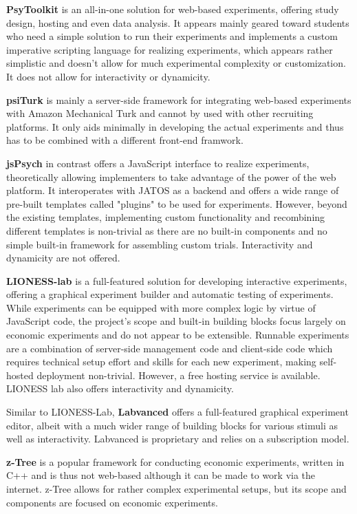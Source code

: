 \documentclass[a4paper,10pt]{paper}
\begin{document}
\textbf{PsyToolkit} \citep{Stoet2012} is an all-in-one solution for web-based experiments, offering study design, hosting and even data analysis. It appears mainly geared toward students who need a simple solution to run their experiments and implements a custom imperative scripting language for realizing experiments, which appears rather simplistic and doesn't allow for much experimental complexity or customization. It does not allow for interactivity or dynamicity.

\textbf{psiTurk} \citep{Gureckis2016} is mainly a server-side framework for integrating web-based experiments with Amazon Mechanical Turk and cannot by used with other recruiting platforms. It only aids minimally in developing the actual experiments and thus has to be combined with a different front-end framwork.

\textbf{jsPsych} \citep{Leeuw2015} in contrast offers a JavaScript interface to realize experiments, theoretically allowing implementers to take advantage of the power of the web platform. It interoperates with JATOS \citep{Lange2015} as a backend and offers a wide range of pre-built templates called "plugins" to be used for experiments. However, beyond the existing templates, implementing custom functionality and recombining different templates is non-trivial as there are no built-in components and no simple built-in framework for assembling custom trials. Interactivity and dynamicity are not offered.

\textbf{LIONESS-lab} \citep{Giamattei2020} is a full-featured solution for developing interactive experiments, offering a graphical experiment builder and automatic testing of experiments. While experiments can be equipped with more complex logic by virtue of JavaScript code, the project's scope and built-in building blocks focus largely on economic experiments and do not appear to be extensible. Runnable experiments are a combination of server-side management code and client-side code which requires technical setup effort and skills for each new experiment, making self-hosted deployment non-trivial. However, a free hosting service is available. LIONESS lab also offers interactivity and dynamicity.

Similar to LIONESS-Lab, \textbf{Labvanced} \citep{Scicovery2018} offers a full-featured graphical experiment editor, albeit with a much wider range of building blocks for various stimuli as well as interactivity. Labvanced is proprietary and relies on a subscription model.

\textbf{z-Tree} \citep{Fischbacher2010} is a popular framework for conducting economic experiments, written in C++ and is thus not web-based although it can be made to work via the internet. z-Tree allows for rather complex experimental setups, but its scope and components are focused on economic experiments.
\end{document}
